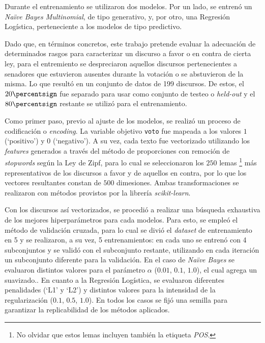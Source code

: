 Durante el entrenamiento se utilizaron dos modelos. Por un lado,
se entrenó un \textit{Naïve Bayes Multinomial}, de tipo generativo,
y, por otro, una Regresión Logística, perteneciente a los modelos de tipo
predictivo. 
\par
Dado que, en términos concretos, este trabajo pretende evaluar la adecuación
de determinados rasgos para caracterizar un discurso a favor o en contra de
cierta ley, para el entremiento se despreciaron aquellos discursos pertenecientes
a senadores que estuvieron ausentes durante la votación o se abstuvieron de la misma.
Lo que resultó en un conjunto de datos de 199 discursos. De estos, el $20\percentsign$
fue separado para usar como conjunto de testeo o \textit{held-out} y el $80\percentsign$
restante se utilizó para el entrenamiento.
\par
Como primer paso, previo al ajuste de los modelos, se realizó un proceso de
codificación o \textit{encoding}. La variable objetivo \texttt{voto} fue mapeada a los
valores $1$ (`positivo') y $0$ (`negativo'). A su vez, cada texto fue vectorizado
utilizando los \textit{features} generados a través del método de proporciones
con remoción de \textit{stopwords} según la Ley de Zipf, para lo cual se seleccionaron
los $250$ lemas
\footnote{No olvidar que estos lemas incluyen también la etiqueta \textit{POS}.} 
más representativos de los discursos a favor y de aquellos
en contra, por lo que los vectores resultantes constan de $500$
dimesiones. Ambas transformaciones se realizaron con métodos provistos por la librería
\textit{scikit-learn}.
\par
Con los discursos así vectorizados, se procedió a realizar una búsqueda exhaustiva de los
mejores hiperparámetros para cada modelos. Para esto, se empleó el método de validación
cruzada, para lo cual se divió el \textit{dataset} de entrenamiento en 5 y se realizaron,
a su vez, 5 entrenamientos: en cada uno se entrenó con 4 subconjuntos y se validó con el
subconjunto restante, utilizando en cada iteración un subconjunto diferente para la
validación. En el caso de \textit{Naïve Bayes} se evaluaron distintos valores para el
parámetro $\alpha$ ($0.01$, $0.1$, $1.0$), el cual agrega un suavizado.. En cuanto a la Regresión Logística, se evaluaron diferentes penalidades
(`L1' y `L2') y distintos valores para la intensidad de la regularización
($0.1$, $0.5$, $1.0$). En todos los casos se fijó una semilla
para garantizar la replicabilidad de los métodos aplicados.
